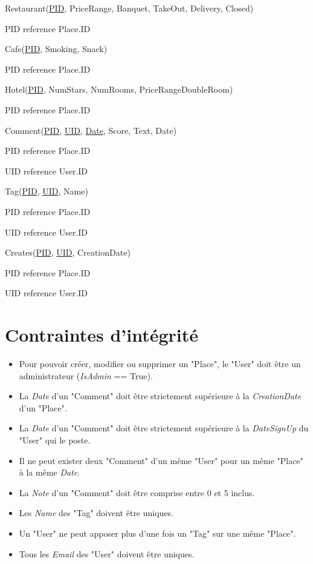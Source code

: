 \documentclass[a4paper,10pt]{article}
\begin{document}
\hspace{-0,5cm}Restaurant(\underline{PID}, PriceRange, Banquet, TakeOut, Delivery, Closed)

PID reference Place.ID

\hspace{-0,5cm}Cafe(\underline{PID}, Smoking, Snack)

PID reference Place.ID

\hspace{-0,5cm}Hotel(\underline{PID}, NumStars, NumRooms, PriceRangeDoubleRoom)

PID reference Place.ID

\hspace{-0,5cm}Comment(\underline{PID}, \underline{UID}, \underline{Date}, Score, Text, Date)

PID reference Place.ID

UID reference User.ID

\hspace{-0,5cm}Tag(\underline{PID}, \underline{UID}, Name)

PID reference Place.ID

UID reference User.ID

\hspace{-0,5cm}Creates(\underline{PID}, \underline{UID}, CreationDate)

PID reference Place.ID

UID reference User.ID

\section{Contraintes d'intégrité}

\begin{itemize}
  \item Pour pouvoir créer, modifier ou supprimer un "Place", le "User" doit être un administrateur (\emph{IsAdmin} == True).
  \item La \emph{Date} d'un "Comment" doit être strictement supérieure à la \emph{CreationDate} d'un "Place".
  \item La \emph{Date} d'un "Comment" doit être strictement supérieure à la \emph{DateSignUp} du "User" qui le poste.
  \item Il ne peut exister deux "Comment" d'un même "User" pour un même "Place" à la même \emph{Date}.
  \item La \emph{Note} d'un "Comment" doit être comprise entre 0 et 5 inclus.
  \item Les \emph{Name} des "Tag" doivent être uniques.
  \item Un "User" ne peut apposer plus d'une fois un "Tag" sur une même "Place".
  \item Tous les \emph{Email} des "User" doivent être uniques.
\end{itemize}
\end{document}
